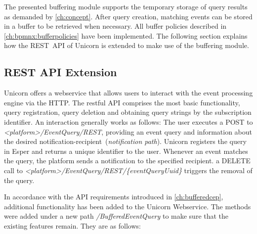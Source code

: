 The presented buffering module supports the temporary storage of query results as demanded by \autoref{ch:concept}. After query creation, matching events can be stored in a buffer to be retrieved when necessary.
All buffer policies described in \autoref{ch:bpmnx:bufferpolicies} have been implemented.
The following section explains how the \acs{REST}~\acs{API} of Unicorn is extended to make use of the buffering module.

\subsection{REST API Extension}\label{ch:impl:unicorn-api}
Unicorn offers a webservice that allows users to interact with the event processing engine via the \ac{HTTP}.
The restful API comprises the most basic functionality, query registration, query deletion and obtaining query strings by the subscription identifier.
An interaction generally works as follows: The user executes a POST to \textit{<platform>/EventQuery/REST}, providing an event query and information about the desired notification-recipient~(\textit{notification path}). Unicorn registers the query in Esper and returns a unique identifier to the user.
Whenever an event matches the query, the platform sends a notification to the specified recipient. a DELETE call to \textit{<platform>/EventQuery/REST/\{eventQueryUuid\}} triggers the removal of the query.

In accordance with the API requirements introduced in \autoref{ch:bufferedcep}, additional functionality has been added to the Unicorn Webservice.
The methods were added under a new path \textit{/BufferedEventQuery} to make sure that the existing features remain. They are as follows:

